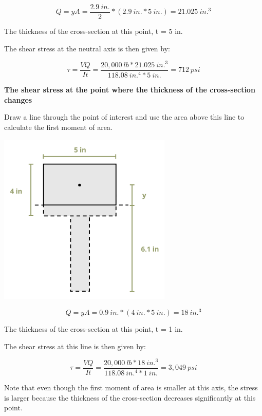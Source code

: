 \documentclass[
  letterpaper,
  DIV=11,
  numbers=noendperiod]{scrreprt}
\theoremstyle{definition}
\theoremstyle{remark}
\begin{document}
\begin{tcolorbox}
\begin{tcolorbox}
\[
Q=y A=\frac{2.9{~in.}}{2} *(2.9{~in.} * 5{~in.})=21.025{~in.}^3
\]

The thickness of the cross-section at this point, t = 5 in.

The shear stress at the neutral axis is then given by:

\[
\tau=\frac{V Q}{I t}=\frac{20,000{~lb} * 21.025{~in.}^3}{118.08{~in.}^4 * 5{~in.}}=712{~psi}
\]

\textbf{The shear stress at the point where the thickness of the
cross-section changes}

Draw a line through the point of interest and use the area above this
line to calculate the first moment of area.

\begin{center}
\includegraphics[width=3.25in,height=\textheight]{images/CH10 PNGs/example 10.4 part 4.png}
\end{center}

\[
Q=y A=0.9{~in.} *(4 {~in.}* 5{~in.})=18{~in.}^3
\]

The thickness of the cross-section at this point, t = 1 in.

The shear stress at this line is then given by:

\[
\tau=\frac{V Q}{I t}=\frac{20,000 {~lb}* 18{~in.}^3}{118.08{~in.}^4 * 1{~in.}}=3,049{~psi}
\]

Note that even though the first moment of area is smaller at this axis,
the stress is larger because the thickness of the cross-section
decreases significantly at this point.

\end{tcolorbox}

\end{tcolorbox}
\end{document}
